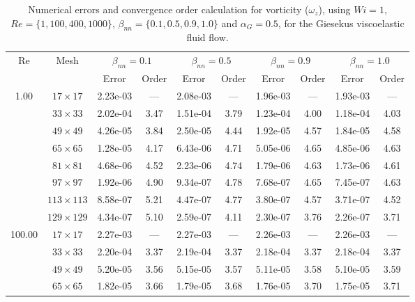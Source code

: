 \documentclass[preprint, 12pt]{elsarticle}
\begin{document}
\begin{center}
\begin{table}[H]
\caption{Numerical errors and convergence order calculation for vorticity ($\omega_{z}$), using \mbox{$Wi=1$}, $Re=\{1,100,400,1000\}$, $\beta_{nn}=\{0.1,0.5,0.9,1.0\}$ and $\alpha_G = 0.5$, for the Giesekus viscoelastic fluid flow.\label{tab_GiesekusWzalphaG05Resumida}}
\scriptsize{
    \begin{tabular*}{\textwidth}{@{\extracolsep\fill}cccccccccc@{}}
    \hline
    \multirow{2}{*}{$\operatorname{Re}$} & \multirow{2}{*}{Mesh} & \multicolumn{2}{c}{$\beta_{nn}=0.1$}  & \multicolumn{2}{c}{$\beta_{nn}=0.5$}  & \multicolumn{2}{c}{$\beta_{nn}=0.9$}  & \multicolumn{2}{c}{$\beta_{nn}=1.0$}\\ %
     & & Error & Order & Error & Order & Error & Order & Error & Order \\
    \hline
    \multirow{7}{*}{1.00} & $17\times 17$ & 2.23e-03 & --- & 2.08e-03 & --- & 1.96e-03 & --- & 1.93e-03 & --- \\
    & $33\times 33$ & 2.02e-04 & 3.47 & 1.51e-04 & 3.79 & 1.23e-04 & 4.00 & 1.18e-04 & 4.03 \\
    & $49\times 49$ & 4.26e-05 & 3.84 & 2.50e-05 & 4.44 & 1.92e-05 & 4.57 & 1.84e-05 & 4.58 \\
    & $65\times 65$ & 1.28e-05 & 4.17 & 6.43e-06 & 4.71 & 5.05e-06 & 4.65 & 4.85e-06 & 4.63 \\
    & $81\times 81$ & 4.68e-06 & 4.52 & 2.23e-06 & 4.74 & 1.79e-06 & 4.63 & 1.73e-06 & 4.61 \\
    & $97\times 97$ & 1.92e-06 & 4.90 & 9.34e-07 & 4.78 & 7.68e-07 & 4.65 & 7.45e-07 & 4.63 \\
    & $113\times 113$ & 8.58e-07 & 5.21 & 4.47e-07 & 4.77 & 3.80e-07 & 4.57 & 3.71e-07 & 4.52 \\
    & $129\times 129$ & 4.34e-07 & 5.10 & 2.59e-07 & 4.11 & 2.30e-07 & 3.76 & 2.26e-07 & 3.71 \\
    \hline\hline
    \multirow{7}{*}{100.00} & $17\times 17$ & 2.27e-03 & --- & 2.27e-03 & --- & 2.26e-03 & --- & 2.26e-03 & --- \\
    & $33\times 33$ & 2.20e-04 & 3.37 & 2.19e-04 & 3.37 & 2.18e-04 & 3.37 & 2.18e-04 & 3.37 \\
    & $49\times 49$ & 5.20e-05 & 3.56 & 5.15e-05 & 3.57 & 5.11e-05 & 3.58 & 5.10e-05 & 3.59 \\
    & $65\times 65$ & 1.82e-05 & 3.66 & 1.79e-05 & 3.68 & 1.76e-05 & 3.70 & 1.75e-05 & 3.71 \\

\end{tabular*}}
\end{table}
\end{center}
\end{document}
